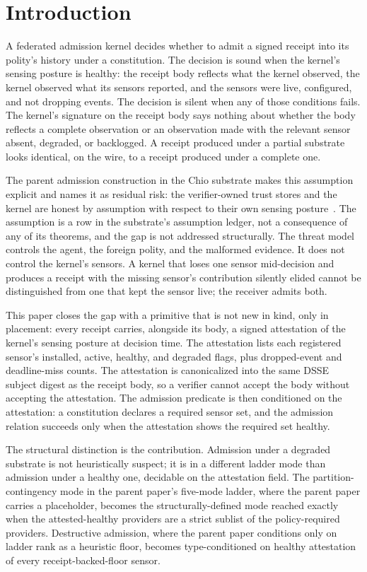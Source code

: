\section{Introduction}
\label{sec:intro}

A federated admission kernel decides whether to admit a signed receipt into its polity's history under a constitution. The decision is sound when the kernel's sensing posture is healthy: the receipt body reflects what the kernel observed, the kernel observed what its sensors reported, and the sensors were live, configured, and not dropping events. The decision is silent when any of those conditions fails. The kernel's signature on the receipt body says nothing about whether the body reflects a complete observation or an observation made with the relevant sensor absent, degraded, or backlogged. A receipt produced under a partial substrate looks identical, on the wire, to a receipt produced under a complete one.

The parent admission construction in the Chio substrate makes this assumption explicit and names it as residual risk: the verifier-owned trust stores and the kernel are honest by assumption with respect to their own sensing posture~\cite{chioProgrammableSovereignty2027}. The assumption is a row in the substrate's assumption ledger, not a consequence of any of its theorems, and the gap is not addressed structurally. The threat model controls the agent, the foreign polity, and the malformed evidence. It does not control the kernel's sensors. A kernel that loses one sensor mid-decision and produces a receipt with the missing sensor's contribution silently elided cannot be distinguished from one that kept the sensor live; the receiver admits both.

This paper closes the gap with a primitive that is not new in kind, only in placement: every receipt carries, alongside its body, a signed attestation of the kernel's sensing posture at decision time. The attestation lists each registered sensor's installed, active, healthy, and degraded flags, plus dropped-event and deadline-miss counts. The attestation is canonicalized into the same DSSE subject digest as the receipt body, so a verifier cannot accept the body without accepting the attestation. The admission predicate is then conditioned on the attestation: a constitution declares a required sensor set, and the admission relation succeeds only when the attestation shows the required set healthy.

The structural distinction is the contribution. Admission under a degraded substrate is not heuristically suspect; it is in a different ladder mode than admission under a healthy one, decidable on the attestation field. The partition-contingency mode in the parent paper's five-mode ladder, where the parent paper carries a placeholder, becomes the structurally-defined mode reached exactly when the attested-healthy providers are a strict sublist of the policy-required providers. Destructive admission, where the parent paper conditions only on ladder rank as a heuristic floor, becomes type-conditioned on healthy attestation of every receipt-backed-floor sensor.

